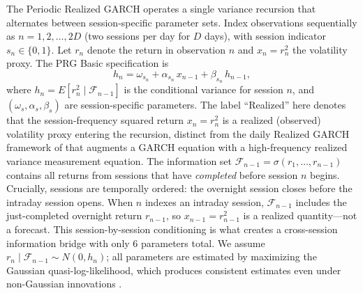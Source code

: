 \documentclass[11pt,a4paper]{article}
\begin{document}
The Periodic Realized GARCH operates a single variance recursion that alternates between session-specific parameter sets. Index observations sequentially as $n = 1, 2, \ldots, 2D$ (two sessions per day for $D$ days), with session indicator $s_n \in \{0, 1\}$. Let $r_n$ denote the return in observation $n$ and $x_n = r^2_n$ the volatility proxy. The PRG Basic specification is
\begin{equation}
    h_n = \omega_{s_n} + \alpha_{s_n} \, x_{n-1} + \beta_{s_n} \, h_{n-1},
    \label{eq:prg_basic}
\end{equation}
where $h_n = E[r^2_n \mid \mathcal{F}_{n-1}]$ is the conditional variance for session $n$, and $(\omega_s, \alpha_s, \beta_s)$ are session-specific parameters. The label ``Realized'' here denotes that the session-frequency squared return $x_n = r^2_n$ is a realized (observed) volatility proxy entering the recursion, distinct from the daily Realized GARCH framework of \citet{Hansen2012} that augments a GARCH equation with a high-frequency realized variance measurement equation. The information set $\mathcal{F}_{n-1} = \sigma(r_1, \ldots, r_{n-1})$ contains all returns from sessions that have \emph{completed} before session $n$ begins. Crucially, sessions are temporally ordered: the overnight session closes before the intraday session opens. When $n$ indexes an intraday session, $\mathcal{F}_{n-1}$ includes the just-completed overnight return $r_{n-1}$, so $x_{n-1} = r^2_{n-1}$ is a realized quantity---not a forecast. This session-by-session conditioning is what creates a cross-session information bridge with only 6 parameters total. We assume $r_n \mid \mathcal{F}_{n-1} \sim N(0, h_n)$; all parameters are estimated by maximizing the Gaussian quasi-log-likelihood, which produces consistent estimates even under non-Gaussian innovations \citep{BollerslevWooldridge1992}.
\end{document}
